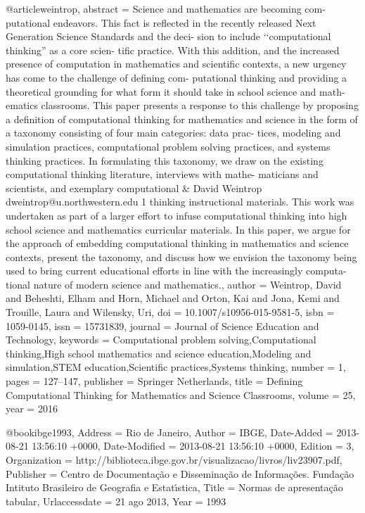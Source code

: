 @article{weintrop,
	abstract = {Science and mathematics are becoming com- putational endeavors. This fact is reflected in the recently released Next Generation Science Standards and the deci- sion to include ‘‘computational thinking'' as a core scien- tific practice. With this addition, and the increased presence of computation in mathematics and scientific contexts, a new urgency has come to the challenge of defining com- putational thinking and providing a theoretical grounding for what form it should take in school science and math- ematics classrooms. This paper presents a response to this challenge by proposing a definition of computational thinking for mathematics and science in the form of a taxonomy consisting of four main categories: data prac- tices, modeling and simulation practices, computational problem solving practices, and systems thinking practices. In formulating this taxonomy, we draw on the existing computational thinking literature, interviews with mathe- maticians and scientists, and exemplary computational {\&} David Weintrop dweintrop@u.northwestern.edu 1 thinking instructional materials. This work was undertaken as part of a larger effort to infuse computational thinking into high school science and mathematics curricular materials. In this paper, we argue for the approach of embedding computational thinking in mathematics and science contexts, present the taxonomy, and discuss how we envision the taxonomy being used to bring current educational efforts in line with the increasingly computa- tional nature of modern science and mathematics.},
	author = {Weintrop, David and Beheshti, Elham and Horn, Michael and Orton, Kai and Jona, Kemi and Trouille, Laura and Wilensky, Uri},
	doi = {10.1007/s10956-015-9581-5},
	isbn = {1059-0145},
	issn = {15731839},
	journal = {Journal of Science Education and Technology},
	keywords = {Computational problem solving,Computational thinking,High school mathematics and science education,Modeling and simulation,STEM education,Scientific practices,Systems thinking},
	number = {1},
	pages = {127--147},
	publisher = {Springer Netherlands},
	title = {{Defining Computational Thinking for Mathematics and Science Classrooms}},
	volume = {25},
	year = {2016}
}




@book{ibge1993,
	Address = {Rio de Janeiro},
	Author = {IBGE},
	Date-Added = {2013-08-21 13:56:10 +0000},
	Date-Modified = {2013-08-21 13:56:10 +0000},
	Edition = {3},
	Organization = {http://biblioteca.ibge.gov.br/visualizacao/livros/liv23907.pdf},
	Publisher = {Centro de Documenta{\c c}{\~a}o e Dissemina{\c c}{\~a}o de Informa{\c c}{\~o}es. Funda{\c c}{\~a}o Intituto Brasileiro de Geografia e Estat{\'\i}stica},
	Title = {Normas de apresenta{\c c}{\~a}o tabular},
	Urlaccessdate = {21 ago 2013},
	Year = {1993}}

